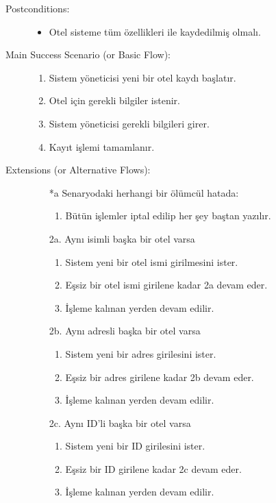 \documentclass[12pt,a4paper]{report}
\begin{document}
\begin{description}
\item[Postconditions:] \hspace{10mm}
\begin{itemize}
\item Otel sisteme tüm özellikleri ile kaydedilmiş olmalı.
\end{itemize}
\item[Main Success Scenario (or Basic Flow):] \hspace{10mm}
\begin{enumerate}
\item Sistem yöneticisi yeni bir otel kaydı başlatır.
\item Otel için gerekli bilgiler istenir.
\item Sistem yöneticisi gerekli bilgileri girer.
\item Kayıt işlemi tamamlanır.
\end{enumerate}
\item[Extensions (or Alternative Flows):] \hspace{10mm}
\begin{itemize}
\item[*a] Senaryodaki herhangi bir ölümcül hatada:
    \begin{enumerate}
    \item Bütün işlemler iptal edilip her şey baştan yazılır.
    \end{enumerate}
\item[2a.] Aynı isimli başka bir otel varsa
    \begin{enumerate}
    \item Sistem yeni bir otel ismi girilmesini ister.
    \item Eşsiz bir otel ismi girilene kadar 2a devam eder.
    \item İşleme kalınan yerden devam edilir.
    \end{enumerate}
\item[2b.] Aynı adresli başka bir otel varsa
    \begin{enumerate}
    \item Sistem yeni bir adres girilesini ister.
    \item Eşsiz bir adres girilene kadar 2b devam eder.
    \item İşleme kalınan yerden devam edilir.
    \end{enumerate}
\item[2c.] Aynı ID'li başka bir otel varsa
    \begin{enumerate}
    \item Sistem yeni bir ID girilesini ister.
    \item Eşsiz bir ID girilene kadar 2c devam eder.
    \item İşleme kalınan yerden devam edilir.
    \end{enumerate}
\end{itemize}
\end{description}
\end{document}
